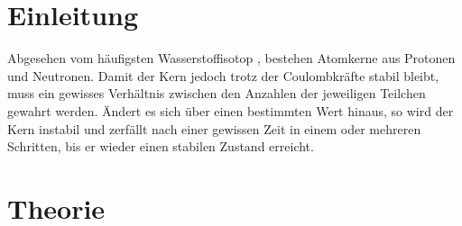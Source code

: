 
	\section{Einleitung}				%
Abgesehen vom häufigsten Wasserstoffisotop , bestehen Atomkerne aus Protonen und Neutronen. Damit der Kern jedoch trotz der Coulombkräfte stabil bleibt, muss ein gewisses Verhältnis zwischen den Anzahlen der jeweiligen Teilchen gewahrt werden. Ändert es sich über einen bestimmten Wert hinaus, so wird der Kern instabil und zerfällt nach einer gewissen Zeit in einem oder mehreren Schritten, bis er wieder einen stabilen Zustand erreicht.
	\section{Theorie}
